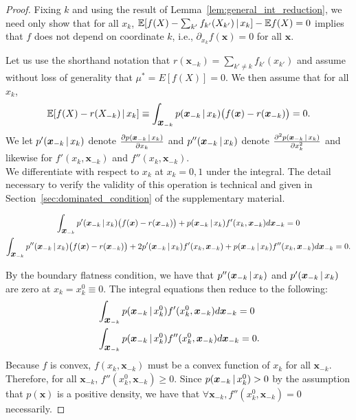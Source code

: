 \begin{proof}

Fixing $k$ and using the result of
Lemma~\ref{lem:general_int_reduction}, 
we need only show that for all $x_k$, $ {\mathbb E}[ f(X) - \sum_{k'}
f_{k'}(X_{k'}) {\,|\,} x_k] - {\mathbb E} f(X) = 0 $ 
implies that $f$ does not depend on coordinate $k$, i.e., 
$\partial_{x_k} f(\mathbf{x}) = 0$ for all $\mathbf{x}$.

Let us use the shorthand notation that $r(\mathbf{x}_{-k}) = \sum_{k'
  \neq k} f_{k'}(x_{k'})$ and assume without loss of generality that
$\mu^* = E[f(X)] = 0$. We then assume that for all $x_k$,
\begin{equation}
 {\mathbb E}[ f(X) - r(X_{-k})  {\,|\,} x_k] \equiv 
 \int_{\mbox{\boldmath $x$}_{-k}}  p(\mbox{\boldmath $x$}_{-k} {\,|\,} x_k ) 
 \big(f(\mbox{\boldmath $x$}) - r(\mbox{\boldmath $x$}_{-k}) \big) = 0.
\end{equation}
We let $p'(\mbox{\boldmath $x$}_{-k} {\,|\,} x_k)$ denote 
$\frac{\partial p(\mbox{\boldmath $\scriptstyle x$}_{-k} {\,|\,} x_k)}{\partial x_k}$ and 
$p''(\mbox{\boldmath $x$}_{-k} {\,|\,} x_k)$ denote 
$\frac{\partial^2 p(\mbox{\boldmath $\scriptstyle x$}_{-k} {\,|\,} x_k)}{\partial x_k^2}$ and
likewise for $f'(x_k, \mathbf{x}_{-k})$ and $f''(x_k,
\mathbf{x}_{-k})$. \\

We differentiate with respect to $x_k$ at $x_k = 0,1$ under the integral. The detail necessary to verify the validity of this operation is technical and given in Section~\ref{sec:dominated_condition} of the supplementary material.

\begin{gather}
\int_{\mbox{\boldmath $x$}_{-k}} p'(\mbox{\boldmath $x$}_{-k} {\,|\,} x_k) 
\big( f(\mbox{\boldmath $x$}) - r(\mbox{\boldmath $x$}_{-k}) \big) + 
p(\mbox{\boldmath $x$}_{-k} {\,|\,} x_k) f'(x_k, \mbox{\boldmath $x$}_{-k}) d \mbox{\boldmath $x$}_{-k}  = 0 
\label{eqn:integral1a} \\
\int_{\mbox{\boldmath $x$}_{-k}} p''(\mbox{\boldmath $x$}_{-k} {\,|\,} x_k) 
\big( f(\mbox{\boldmath $x$}) - r(\mbox{\boldmath $x$}_{-k}) \big) 
    + 2 p'(\mbox{\boldmath $x$}_{-k} {\,|\,} x_k) f'(x_k, \mbox{\boldmath $x$}_{-k}) +
p(\mbox{\boldmath $x$}_{-k} {\,|\,} x_k) f''(x_k, \mbox{\boldmath $x$}_{-k}) d\mbox{\boldmath $x$}_{-k}  = 0 .
\end{gather}

By the boundary flatness condition, we have that $p''(\mbox{\boldmath $x$}_{-k}
{\,|\,} x_k)$ and $p'(\mbox{\boldmath $x$}_{-k} {\,|\,} x_k)$ are zero at $x_k =
x_k^0 \equiv 0$. The integral equations then reduce to the following:
\begin{align}
& \int_{\mbox{\boldmath $x$}_{-k}} p(\mbox{\boldmath $x$}_{-k} {\,|\,} x^0_k) f'(x^0_k, \mbox{\boldmath $x$}_{-k}) d \mbox{\boldmath $x$}_{-k}= 0 \label{eqn:integral1b} \\
& \int_{\mbox{\boldmath $x$}_{-k}} p(\mbox{\boldmath $x$}_{-k} {\,|\,} x^0_k) f''(x^0_k, \mbox{\boldmath $x$}_{-k}) d\mbox{\boldmath $x$}_{-k} = 0.
\end{align}
Because $f$ is convex, $f(x_k, \mathbf{x}_{-k})$ must be a convex
function of 
$x_k$ for all $\mathbf{x}_{-k}$. Therefore, for all $\mathbf{x}_{-k}$,
$f''(x^0_k, \mathbf{x}_{-k}) \geq 0$. Since $p(\mbox{\boldmath $x$}_{-k} {\,|\,}
x^0_k) > 0$ by the assumption that $p(\mathbf{x})$ is a positive density, 
we have that $\forall \mathbf{x}_{-k}, f''(x^0_k, \mathbf{x}_{-k}) = 0$ necessarily.


\end{proof}

